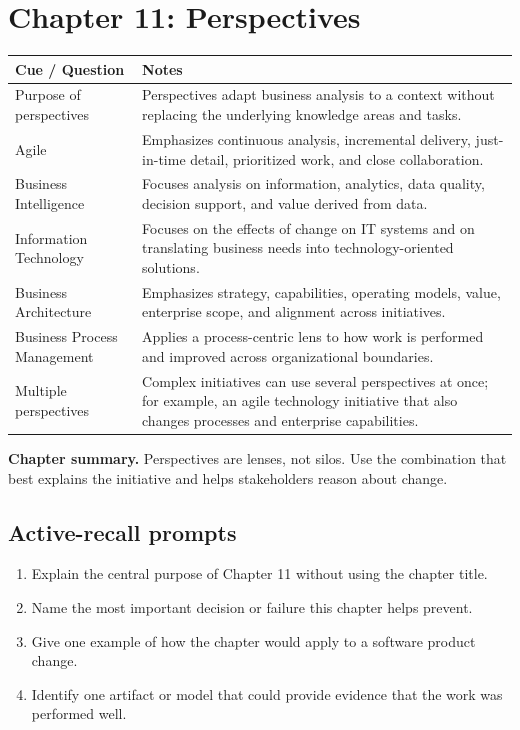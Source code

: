 \documentclass[11pt]{article}
\begin{document}
\section{Chapter 11: Perspectives}
\begin{longtable}{L{0.26\textwidth} L{0.64\textwidth}}
\toprule
\textbf{Cue / Question} & \textbf{Notes}\\
\midrule
\endhead
Purpose of perspectives & Perspectives adapt business analysis to a context without replacing the underlying knowledge areas and tasks.\\
Agile & Emphasizes continuous analysis, incremental delivery, just-in-time detail, prioritized work, and close collaboration.\\
Business Intelligence & Focuses analysis on information, analytics, data quality, decision support, and value derived from data.\\
Information Technology & Focuses on the effects of change on IT systems and on translating business needs into technology-oriented solutions.\\
Business Architecture & Emphasizes strategy, capabilities, operating models, value, enterprise scope, and alignment across initiatives.\\
Business Process Management & Applies a process-centric lens to how work is performed and improved across organizational boundaries.\\
Multiple perspectives & Complex initiatives can use several perspectives at once; for example, an agile technology initiative that also changes processes and enterprise capabilities.\\
\bottomrule
\end{longtable}
\begin{keybox}\textbf{Chapter summary.} Perspectives are lenses, not silos. Use the combination that best explains the initiative and helps stakeholders reason about change.\end{keybox}
\subsection*{Active-recall prompts}
\begin{enumerate}
\item Explain the central purpose of Chapter 11 without using the chapter title.
\item Name the most important decision or failure this chapter helps prevent.
\item Give one example of how the chapter would apply to a software product change.
\item Identify one artifact or model that could provide evidence that the work was performed well.
\end{enumerate}
\end{document}
